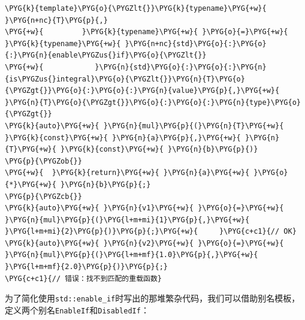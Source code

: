 \begin{itemize}
\begin{codeblockbg}
\begin{Verbatim}[commandchars=\\\{\},breaklines=true,breakanywhere=true,fontsize=\codefont,xleftmargin=17bp]
\PYG{k}{template}\PYG{o}{\PYGZlt{}}\PYG{k}{typename}\PYG{+w}{ }\PYG{n+nc}{T}\PYG{p}{,}
\PYG{+w}{         }\PYG{k}{typename}\PYG{+w}{ }\PYG{o}{=}\PYG{+w}{ }\PYG{k}{typename}\PYG{+w}{ }\PYG{n+nc}{std}\PYG{o}{:}\PYG{o}{:}\PYG{n}{enable\PYGZus{}if}\PYG{o}{\PYGZlt{}}
\PYG{+w}{            }\PYG{n}{std}\PYG{o}{:}\PYG{o}{:}\PYG{n}{is\PYGZus{}integral}\PYG{o}{\PYGZlt{}}\PYG{n}{T}\PYG{o}{\PYGZgt{}}\PYG{o}{:}\PYG{o}{:}\PYG{n}{value}\PYG{p}{,}\PYG{+w}{ }\PYG{n}{T}\PYG{o}{\PYGZgt{}}\PYG{o}{:}\PYG{o}{:}\PYG{n}{type}\PYG{o}{\PYGZgt{}}
\PYG{k}{auto}\PYG{+w}{ }\PYG{n}{mul}\PYG{p}{(}\PYG{n}{T}\PYG{+w}{ }\PYG{k}{const}\PYG{+w}{ }\PYG{n}{a}\PYG{p}{,}\PYG{+w}{ }\PYG{n}{T}\PYG{+w}{ }\PYG{k}{const}\PYG{+w}{ }\PYG{n}{b}\PYG{p}{)}
\PYG{p}{\PYGZob{}}
\PYG{+w}{  }\PYG{k}{return}\PYG{+w}{ }\PYG{n}{a}\PYG{+w}{ }\PYG{o}{*}\PYG{+w}{ }\PYG{n}{b}\PYG{p}{;}
\PYG{p}{\PYGZcb{}}
\PYG{k}{auto}\PYG{+w}{ }\PYG{n}{v1}\PYG{+w}{ }\PYG{o}{=}\PYG{+w}{ }\PYG{n}{mul}\PYG{p}{(}\PYG{l+m+mi}{1}\PYG{p}{,}\PYG{+w}{ }\PYG{l+m+mi}{2}\PYG{p}{)}\PYG{p}{;}\PYG{+w}{     }\PYG{c+c1}{// OK}
\PYG{k}{auto}\PYG{+w}{ }\PYG{n}{v2}\PYG{+w}{ }\PYG{o}{=}\PYG{+w}{ }\PYG{n}{mul}\PYG{p}{(}\PYG{l+m+mf}{1.0}\PYG{p}{,}\PYG{+w}{ }\PYG{l+m+mf}{2.0}\PYG{p}{)}\PYG{p}{;}
\PYG{c+c1}{// 错误：找不到匹配的重载函数}
\end{Verbatim}
\end{codeblockbg}

\end{itemize}



为了简化使用\texttt{std::\allowbreak{}enable\_\allowbreak{}if}时写出的那堆繁杂代码，我们可以借助别名模板，定义两个别名\texttt{EnableIf}和\texttt{DisabledIf}：



